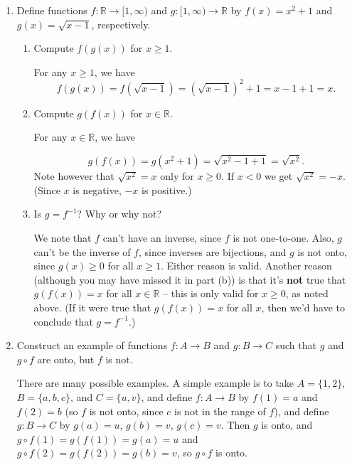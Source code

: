 \documentclass[12pt]{article}
\newcommand{\points}[1]{\marginpar{\hspace{24pt}[#1]}}
\newcommand{\R}{\mathbb{R}}
\begin{document}
\thispagestyle{fancy}

 \begin{enumerate}
 \item Define functions $f:\R\to [1,\infty)$ and $g:[1,\infty)\to \R$ by $f(x)=x^2+1$ and $g(x)=\sqrt{x-1}$, respectively.
\begin{enumerate}
 \item Compute $f(g(x))$ for $x\geq 1$. \points{2}

\bigskip

 For any $x\geq 1$, we have 
\[
 f(g(x)) = f(\sqrt{x-1}) = (\sqrt{x-1})^2+1 = x-1+1 = x.
\]


\bigskip

 \item Compute $g(f(x))$ for $x\in\R$. \points{2}


\bigskip

 For any $x\in\R$, we have

\[
 g(f(x)) = g(x^2+1) = \sqrt{x^2-1+1} = \sqrt{x^2}.
\]
Note however that $\sqrt{x^2}=x$ only for $x\geq 0$. If $x<0$ we get $\sqrt{x^2}=-x$. (Since $x$ is negative, $-x$ is positive.)

\bigskip


 \item Is $g=f^{-1}$? Why or why not? \points{1}

\bigskip

 We note that $f$ can't have an inverse, since $f$ is not one-to-one. Also, $g$ can't be the inverse of $f$, since inverses are bijections, and $g$ is not onto, since $g(x)\geq 0$ for all $x\geq 1$. Either reason is valid. Another reason (although you may have missed it in part (b)) is that it's {\bf not} true that $g(f(x))=x$ for all $x\in \R$ -- this is only valid for $x\geq 0$, as noted above. (If it were true that $g(f(x))=x$ for all $x$, then we'd have to conclude that $g=f^{-1}$.)

\bigskip

\end{enumerate}

\item Construct an example of functions $f:A\to B$ and $g:B\to C$ such that $g$ and $g\circ f$ are onto, but $f$ is not. \points{3}


\bigskip

 There are many possible examples. A simple example is to take $A=\{1,2\}$, $B = \{a,b,c\}$, and $C=\{u,v\}$, and define $f:A\to B$ by $f(1)=a$ and $f(2)=b$ (so $f$ is not onto, since $c$ is not in the range of $f$), and define $g:B\to C$ by $g(a)=u$, $g(b)=v$, $g(c)=v$. Then $g$ is onto, and $g\circ f(1) = g(f(1))=g(a)=u$ and $g\circ f(2) = g(f(2))=g(b)=v$, so $g\circ f$ is onto.


\end{enumerate}
\end{document}
